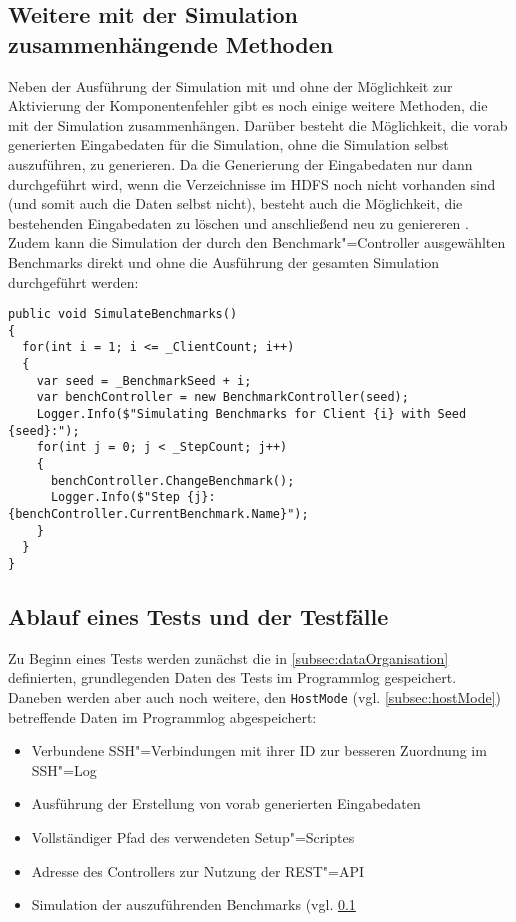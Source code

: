 \subsection{Weitere mit der Simulation zusammenhängende Methoden}
\label{subsec:simulationUtilities}

Neben der Ausführung der Simulation mit und ohne der Möglichkeit zur Aktivierung der Komponentenfehler gibt es noch einige weitere Methoden, die mit der Simulation zusammenhängen.
Darüber besteht die Möglichkeit, die vorab generierten Eingabedaten für die Simulation, ohne die Simulation selbst auszuführen, zu generieren.
Da die Generierung der Eingabedaten nur dann durchgeführt wird, wenn die Verzeichnisse im \ac{HDFS} noch nicht vorhanden sind (und somit auch die Daten selbst nicht), besteht auch die Möglichkeit, die bestehenden Eingabedaten zu löschen und anschließend neu zu geniereren .
Zudem kann die Simulation der durch den Benchmark"=Controller ausgewählten Benchmarks direkt und ohne die Ausführung der gesamten Simulation durchgeführt werden:

\begin{lstlisting}[label=lst:hadoopSimulationBenchmarks,style=cs,
caption={Simulation der auszuführenden Benchmarks}]
public void SimulateBenchmarks()
{
  for(int i = 1; i <= _ClientCount; i++)
  {
    var seed = _BenchmarkSeed + i;
    var benchController = new BenchmarkController(seed);
    Logger.Info($"Simulating Benchmarks for Client {i} with Seed {seed}:");
    for(int j = 0; j < _StepCount; j++)
    {
      benchController.ChangeBenchmark();
      Logger.Info($"Step {j}: {benchController.CurrentBenchmark.Name}");
    }
  }
}
\end{lstlisting}

\subsection{Ablauf eines Tests und der Testfälle}
\label{subsec:simulationStep}

Zu Beginn eines Tests werden zunächst die in \cref{subsec:dataOrganisation} definierten, grundlegenden Daten des Tests im Programmlog gespeichert.
Daneben werden aber auch noch weitere, den \texttt{HostMode} (vgl. \cref{subsec:hostMode}) betreffende Daten im Programmlog abgespeichert:

\begin{itemize}
    \item Verbundene SSH"=Verbindungen mit ihrer ID zur besseren Zuordnung im SSH"=Log
    \item Ausführung der Erstellung von vorab generierten Eingabedaten
    \item Vollständiger Pfad des verwendeten Setup"=Scriptes
    \item Adresse des Controllers zur Nutzung der REST"=API
    \item Simulation der auszuführenden Benchmarks (vgl. \cref{subsec:simulationUtilities}
\end{itemize}

